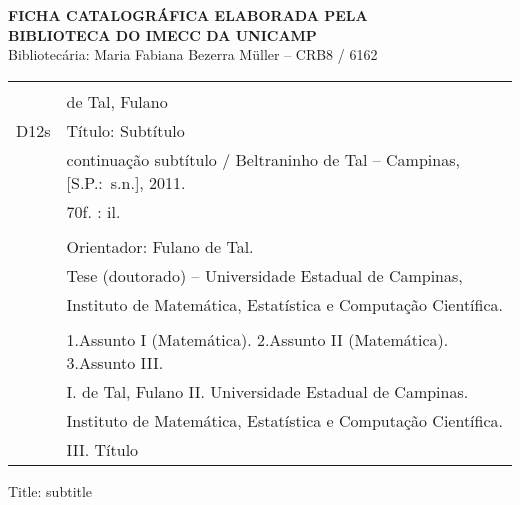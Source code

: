 \begin{center}
    {\sf
    \Large \textbf{FICHA CATALOGR\'AFICA ELABORADA PELA\\ BIBLIOTECA DO IMECC
    DA UNICAMP}} \\
    Bibliotec\'aria: Maria Fabiana Bezerra M\"uller -- CRB8 / 6162 \\[1cm]
\end{center}

\begin{center}
    \begin{tabular}{|cl|} \hline
      \hspace{1.3cm} & \\
      & de Tal, Fulano  \\
      \hspace{0.2cm} D12s & \hspace{0.6cm} T\'itulo: Subt\'itulo  \\ 
      &  continua\c{c}\~ao subt\'itulo / Beltraninho de Tal --
      Campinas,  [S.P.:~s.n.], 2011. \\
      & \hspace{0.65cm} 70f. : il. \\
      & \\
      & \hspace{0.6cm} Orientador: Fulano de Tal.\\
      & \hspace{0.6cm} Tese (doutorado) -- 
    Universidade Estadual de Campinas, \\
      & Instituto de Matem\'atica, Estat\'istica e Computa\c{c}\~ao
      Cient\'ifica.\\ 
      & \\
      & \hspace{0.6cm} 1.Assunto I (Matem\'atica). 2.Assunto II (Matem\'atica).  
      3.Assunto III.  \\ 
      & I. de Tal, Fulano   \hspace{0.1cm} II. Universidade Estadual de
    Campinas.  \\
      & Instituto
      de Matem\'atica, Estat\'istica e Computa\c{c}\~ao Cient\'ifica. \\   
      &  III. T\'itulo \\
      \hline
    \end{tabular}
\end{center}

\vspace{2cm}

 Title: subtitle

